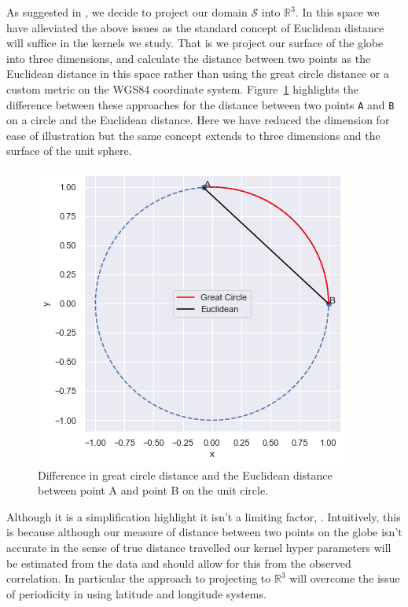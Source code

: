 As suggested in \citep{guinness_isotropic_2016}, we decide to project our domain $\mathcal{S}$ into $\mathbb{R}^3$.
In this space we have alleviated the above issues as the standard concept of Euclidean distance will suffice in the kernels we study.
That is we project our surface of the globe into three dimensions, and calculate the distance between two points as the Euclidean distance in this space rather than using the great circle distance or a custom metric on the WGS84 coordinate system. 
Figure~\ref{fig:spatial_projection} highlights the difference between these approaches for the distance between two points \verb*|A| and \verb*|B| on a circle and the Euclidean distance.
Here we have reduced the dimension for ease of illustration but the same concept extends to three dimensions and the surface of the unit sphere. 

\begin{figure}[h]
	\centering
	\includegraphics[width=\textwidth]{spatial_projection}
	\caption[Difference in great circle distance and the Euclidean distance in $\mathbb{R}^2$.]{Difference in great circle distance and the Euclidean distance between point A and point B on the unit circle.}
	\label{fig:spatial_projection}
\end{figure}

Although it is a simplification \citep{guinness_isotropic_2016} highlight it isn't a limiting factor, \citep{guinness_isotropic_2016}. 
Intuitively, this is because although our measure of distance between two points on the globe isn't accurate in the sense of true distance travelled our kernel hyper parameters will be estimated from the data and should allow for this from the observed correlation.
In particular the approach to projecting to $\mathbb{R}^3$ will overcome the issue of periodicity in using latitude and longitude systems.

